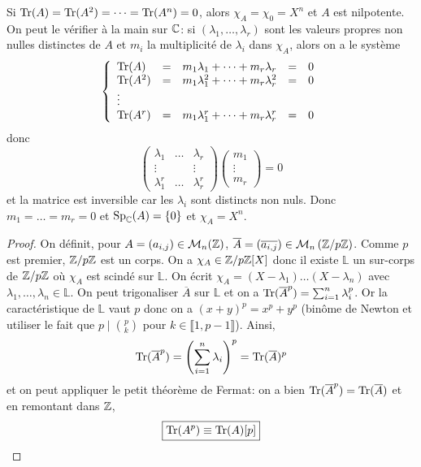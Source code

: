 \documentclass[12pt]{article}
\begin{document}
\begin{remark}
	Si $\operatorname{Tr}(A)=\operatorname{Tr}(A^{2})=\dots=\operatorname{Tr}(A^{n})=0$, alors $\chi_{A}=\chi_{0}=X^{n}$ et $A$ est nilpotente. On peut le vérifier à la main sur $\mathbb{C}$: si $(\lambda_{1},\dots,\lambda_{r})$ sont les valeurs propres non nulles distinctes de $A$ et $m_{i}$ la multiplicité de $\lambda_{i}$ dans $\chi_{A}$, alors on a le système
	\begin{equation}
		\left\lbrace
			\begin{array}[]{lllll}
				\Tr(A)&=&m_{1}\lambda_{1}+\dots+m_{r}\lambda_{r}&=&0\\
				\Tr(A^{2})&=&m_{1}\lambda_{1}^{2}+\dots+m_{r}\lambda_{r}^{2}&=&0\\
				\vdots\\
				\Tr(A^{r})&=&m_{1}\lambda_{1}^{r}+\dots+m_{r}\lambda_{r}^{r}&=&0
			\end{array}
		\right.
	\end{equation}
	donc 
	\begin{equation}
		\begin{pmatrix}
			\lambda_{1}&\dots&\lambda_{r}\\
			\vdots&&\vdots\\
			\lambda_{1}^{r}&\dots&\lambda_{r}^{r}
		\end{pmatrix}\begin{pmatrix}
			m_{1}\\\vdots\\m_{r}
		\end{pmatrix}=0
	\end{equation}
	et la matrice est inversible car les $\lambda_{i}$ sont distincts non nuls. Donc $m_{1}=\dots=m_{r}=0$ et $\operatorname{Sp}_{\mathbb{C}}(A)=\lbrace0\rbrace$ et $\chi_{A}=X^{n}$.
\end{remark}

\begin{proof}
	On définit, pour $A=(a_{i,j})\in\mathcal{M}_{n}(\mathbb{Z})$, $\overline{A}=(\overline{a_{i,j}})\in\mathcal{M}_{n}\left(\mathbb{Z}/p\mathbb{Z}\right)$. Comme $p$ est premier, $\mathbb{Z}/p\mathbb{Z}$ est un corps. On a $\chi_{A}\in\mathbb{Z}/p\mathbb{Z}[X]$ donc il existe $\mathbb{L}$ un sur-corps de $\mathbb{Z}/p\mathbb{Z}$ où $\chi_{A}$ est scindé sur $\mathbb{L}$. On écrit $\chi_{A}=(X-\lambda_{1})\dots(X-\lambda_{n})$ avec $\lambda_{1},\dots,\lambda_{n}\in\mathbb{L}$. On peut trigonaliser $\overline{A}$ sur $\mathbb{L}$ et on a $\operatorname{Tr}(\overline{A}^{p})=\sum_{i=1}^{n}\lambda_{i}^{p}$. Or la caractéristique de $\mathbb{L}$ vaut $p$ donc on a $(x+y)^{p}=x^{p}+y^{p}$ (binôme de Newton et utiliser le fait que $p\mid\binom{p}{k}$ pour $k\in\llbracket1,p-1\rrbracket$). Ainsi,
	\begin{equation}
		\operatorname{Tr}(\overline{A}^{p})=\left(\sum_{i=1}^{n}\lambda_{i}\right)^{p}=\operatorname{Tr}(\overline{A})^{p}
	\end{equation}
	et on peut appliquer le petit théorème de Fermat: on a bien $\operatorname{Tr}(\overline{A}^{p})=\operatorname{Tr}(\overline{A})$ et en remontant dans $\mathbb{Z}$, 
	\begin{equation}
		\boxed{\operatorname{Tr}(A^{p})\equiv\operatorname{Tr}(A)[p]}
	\end{equation}
\end{proof}
\end{document}
